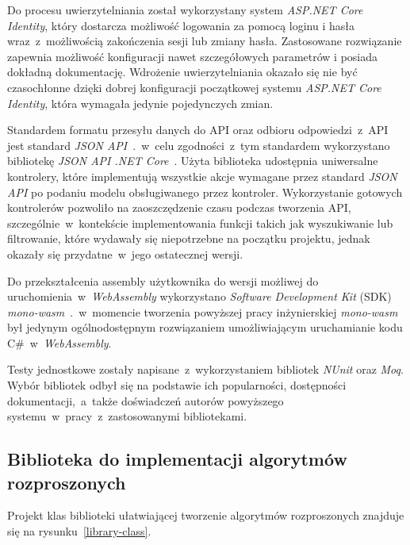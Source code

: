 \documentclass[a4paper,11pt,twoside]{report}
\theoremstyle{definition}
\begin{document}
Do procesu uwierzytelniania został wykorzystany system \textit{ASP.NET Core Identity}, który dostarcza możliwość logowania za pomocą loginu i hasła wraz~z~możliwością zakończenia sesji lub zmiany hasła. Zastosowane rozwiązanie zapewnia możliwość konfiguracji nawet szczegółowych parametrów i posiada dokładną dokumentację. 
Wdrożenie uwierzytelniania okazało się nie być czasochłonne dzięki dobrej konfiguracji początkowej systemu \textit{ASP.NET Core Identity}, która wymagała jedynie pojedynczych zmian.

Standardem formatu przesyłu danych do API oraz odbioru odpowiedzi~z~API jest standard \textit{JSON API}~\cite{jsonapi}.~w~celu zgodności~z~tym standardem wykorzystano bibliotekę \textit{JSON API .NET Core}~\cite{jsonapi-dotnet-core}. Użyta biblioteka udostępnia uniwersalne kontrolery, które implementują wszystkie akcje wymagane przez standard \textit{JSON API} po podaniu modelu obsługiwanego przez kontroler. Wykorzystanie gotowych kontrolerów pozwoliło na zaoszczędzenie czasu podczas tworzenia API, szczególnie~w~kontekście implementowania funkcji takich jak wyszukiwanie lub filtrowanie, które wydawały się niepotrzebne na początku projektu, jednak okazały się przydatne~w~jego ostatecznej wersji.

Do przekształcenia assembly użytkownika do wersji możliwej do uruchomienia~w~\textit{WebAssembly} wykorzystano \textit{Software Development Kit} (SDK) \textit{mono-wasm}~\cite{mono-wasm}.~w~momencie tworzenia powyższej pracy inżynierskiej \textit{mono-wasm} był jedynym ogólnodostępnym rozwiązaniem umożliwiającym uruchamianie kodu C\#~w~\textit{WebAssembly}.

Testy jednostkowe zostały napisane~z~wykorzystaniem bibliotek \textit{NUnit} oraz \textit{Moq}. Wybór bibliotek odbył się na podstawie ich popularności, dostępności dokumentacji,~a~także doświadczeń autorów powyższego systemu~w~pracy~z~zastosowanymi bibliotekami.

\subsection{Biblioteka do implementacji algorytmów rozproszonych}
\label{biblioteka-szczegoly}

Projekt klas biblioteki ułatwiającej tworzenie algorytmów rozproszonych znajduje się na rysunku~\ref{library-class}.
\end{document}
